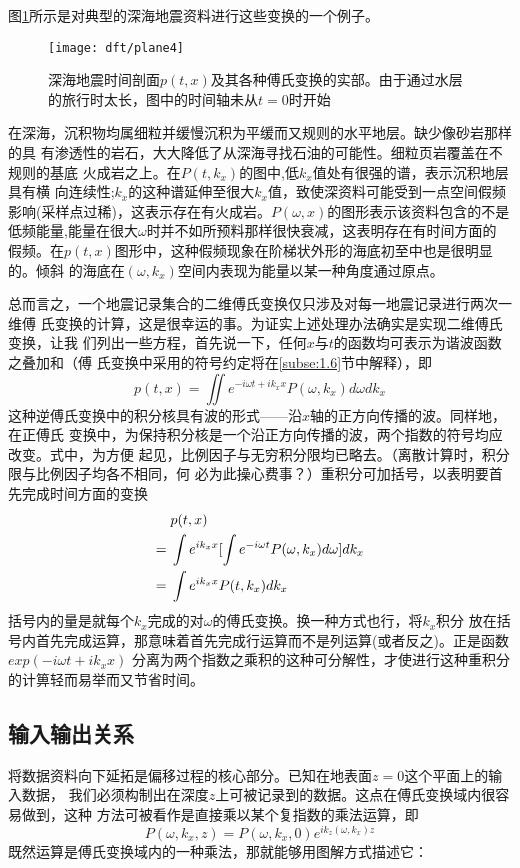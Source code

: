 图\ref{fig:dft/plane4}所示是对典型的深海地震资料进行这些变换的一个例子。
\begin{figure}[H]
\centering
\texttt{[image: dft/plane4]}
\caption[plane4]{深海地震时间剖面$p(t,x)$及其各种傅氏变换的实部。由于通过水层
的旅行时太长，图中的时间轴未从$t=0$时开始}
\label{fig:dft/plane4}
\end{figure}

在深海，沉积物均属细粒并缓慢沉积为平缓而又规则的水平地层。缺少像砂岩那样的具
有渗透性的岩石，大大降低了从深海寻找石油的可能性。细粒页岩覆盖在不规则的基底
火成岩之上。在$P(t,k_{x})$的图中,低$k_{x}$值处有很强的谱，表示沉积地层具有横
向连续性;$k_{x}$的这种谱延伸至很大$k_{x}$值，致使深资料可能受到一点空间假频
影响(采样点过稀)，这表示存在有火成岩。$P(\omega,x)$的图形表示该资料包含的不是
低频能量,能量在很大$\omega$时并不如所预料那样很快衰减，这表明存在有时间方面的
假频。在$p(t,x)$图形中，这种假频现象在阶梯状外形的海底初至中也是很明显的。倾斜
的海底在$(\omega,k_{x})$空间内表现为能量以某一种角度通过原点。

总而言之，一个地震记录集合的二维傅氏变换仅只涉及对每一地震记录进行两次一维傅
氏变换的计算，这是很幸运的事。为证实上述处理办法确实是实现二维傅氏变换，让我
们列出一些方程，首先说一下，任何$x$与$t$的函数均可表示为谐波函数之叠加和（傅
氏变换中采用的符号约定将在\ref{subse:1.6}节中解释），即
\begin{equation}
p(t,x) = \iint e^{-i\omega t+ik_{x}x}P(\omega,k_{x})d\omega dk_{x}
\label{eq:ex1.2.9}
\end{equation}
这种逆傅氏变换中的积分核具有波的形式——沿$x$轴的正方向传播的波。同样地，在正傅氏
变换中，为保持积分核是一个沿正方向传播的波，两个指数的符号均应改变。式中，为方便
起见，比例因子与无穷积分限均已略去。（离散计算时，积分限与比例因子均各不相同，何
必为此操心费事？）重积分可加括号，以表明要首先完成时间方面的变换
\begin{align*}
   & p(t,x) \notag \\
={}& \int e^{ik_{x}x}[\int e^{-i\omega t}P(\omega,k_{x})d\omega]dk_{x} \notag \\
={}& \int e^{ik_{x}x}P(t,k_{x})dk_{x} \notag
\end{align*}
括号内的量是就每个$k_{x}$完成的对$\omega$的傅氏变换。换一种方式也行，将$k_{x}$积分
放在括号内首先完成运算，那意味着首先完成行运算而不是列运算(或者反之)。正是函数$exp(-i\omega t+ik_{x}x)$
分离为两个指数之乘积的这种可分解性，才使进行这种重积分的计箅轻而易举而又节省时间。

\subsection{输入输出关系}
将数据资料向下延拓是偏移过程的核心部分。已知在地表面$z=0$这个平面上的输入数据，
我们必须构制出在深度$z$上可被记录到的数据。这点在傅氏变换域内很容易做到，这种
方法可被看作是直接乘以某个复指数的乘法运算，即
\begin{equation}
P(\omega,k_{x},z) = P(\omega,k_{x},0)e^{ik_{z}(\omega,k_{x})z}
\label{eq:ex1.2.10}
\end{equation}
既然运算是傅氏变换域内的一种乘法，那就能够用图解方式描述它：

